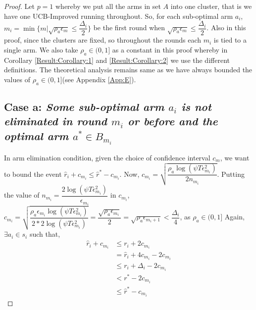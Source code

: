 \begin{proof}

Let $p=1$ whereby we put all the arms in set $A$ into one cluster, that is we have one UCB-Improved running throughout. So, for each sub-optimal arm $a_{i}$, $m_{i}=\min{\lbrace m|\sqrt{\rho_{a}\epsilon_{m}}\leq \dfrac{\Delta_{i}}{2} \rbrace}$ be the first round when $\sqrt{\rho_{a}\epsilon_{m}}\leq \dfrac{\Delta_{i}}{2}$. Also in this proof, since the clusters are fixed, so throughout the rounds each $m_{i}$ is tied to a single arm. We also take $\rho_{a}\in (0,1]$ as a constant in this proof whereby in Corollary \ref{Result:Corollary:1} and \ref{Result:Corollary:2} we use the different definitions. The theoretical analysis remains same as we have always bounded the values of $\rho_{a}\in (0,1]$(see Appendix \ref{App:E}). 


\subsection*{Case a: \textit{Some sub-optimal arm $a_{i}$ is not eliminated in round $m_{i}$ or before and the optimal arm $a^{*}\in B_{m_{i}}$}}

 In arm elimination condition, given the choice of confidence interval $c_{m}$, we want to bound the event $\hat{r}_{i}+c_{m_{i}}\leq \hat{r}^{*}-c_{m_{i}}$. 
  Now, $c_{m_{i}}=\sqrt{\dfrac{\rho_{a}\log (\psi T\epsilon_{m_{i}}^{2})}{2 n_{m_{i}}}}$.
  Putting the value of $n_{m_{i}}=\dfrac{2\log{(\psi T\epsilon_{m_{i}}^{2})}}{\epsilon_{m_{i}}}$ in $c_{m_{i}}$,
  $c_{m_{i}}=\sqrt{\dfrac{\rho_{a}\epsilon_{m_{i}}\log (\psi T\epsilon_{m_{i}}^{2})}{2*2 \log(\psi T\epsilon_{m_{i}}^{2})}}=\dfrac{\sqrt{\rho_{a}\epsilon_{m_{i}}}}{2} = \sqrt{\rho_{a}\epsilon_{m_{i}+1}} < \dfrac{\Delta_{i}}{4} $, as $\rho_{a}\in (0,1]$
  Again, $\exists a_{i} \in s_{i}$ such that, 
  \begin{align*}
\hat{r}_{i} + c_{m_{i}}&\leq r_{i} + 2c_{m_{i}} \\
&= \hat{r}_{i} + 4c_{m_{i}} - 2c_{m_{i}} \\
 &\leq r_{i} + \Delta_{i} - 2c_{m_{i}}\\
 &< r^{*} -2c_{m_{i}} \\
 &\leq \hat{r}^{*} - c_{m_{i}}   
  \end{align*}


\end{proof}
